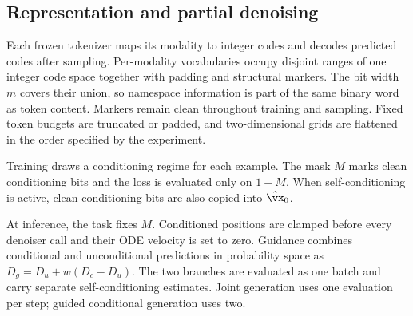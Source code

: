 \subsection{Representation and partial denoising}

Each frozen tokenizer maps its modality to integer codes and decodes predicted codes after
sampling. Per-modality vocabularies occupy disjoint ranges of one integer code space together with
padding and structural markers. The bit width $m$ covers their union, so namespace information is
part of the same binary word as token content. Markers remain clean throughout training and
sampling. Fixed token budgets are truncated or padded, and two-dimensional grids are flattened in
the order specified by the experiment.

Training draws a conditioning regime for each example. The mask $M$ marks clean conditioning bits
and the loss is evaluated only on $1-M$. When self-conditioning is active, clean conditioning bits
are also copied into $\hat\vx_0$.


At inference, the task fixes $M$. Conditioned positions are clamped before every denoiser call and
their ODE velocity is set to zero. Guidance combines conditional and unconditional predictions in
probability space as $D_g=D_u+w(D_c-D_u)$. The two branches are evaluated as one batch and carry
separate self-conditioning estimates. Joint generation uses one evaluation per step; guided
conditional generation uses two.

